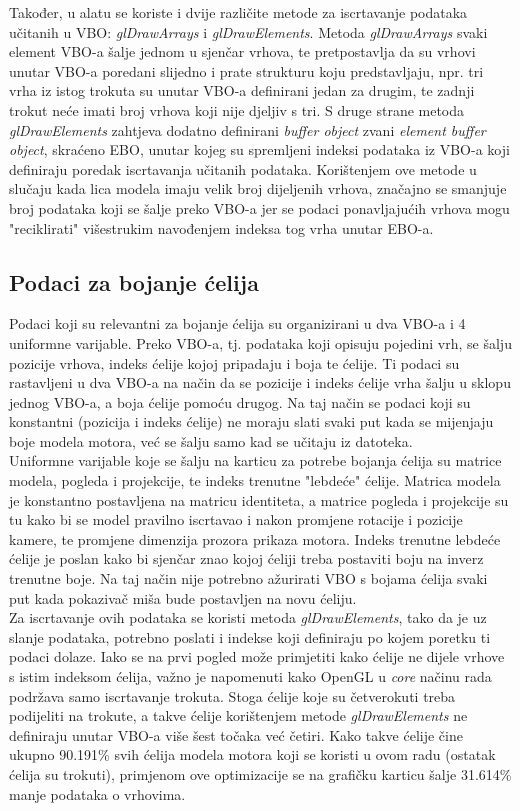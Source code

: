 \documentclass[times, utf8, diplomski]{fer}
\begin{document}
Također, u alatu se koriste i dvije različite metode za iscrtavanje podataka učitanih u VBO: \textit{glDrawArrays} i \textit{glDrawElements}. Metoda \textit{glDrawArrays} svaki element VBO-a šalje jednom u sjenčar vrhova, te pretpostavlja da su vrhovi unutar VBO-a poredani slijedno i prate strukturu koju predstavljaju, npr. tri vrha iz istog trokuta su unutar VBO-a definirani jedan za drugim, te zadnji trokut neće imati broj vrhova koji nije djeljiv s tri. S druge strane metoda \textit{glDrawElements} zahtjeva dodatno definirani \textit{buffer object} zvani \textit{element buffer object}, skraćeno EBO, unutar kojeg su spremljeni indeksi podataka iz VBO-a koji definiraju poredak iscrtavanja učitanih podataka. Korištenjem ove metode u slučaju kada lica modela imaju velik broj dijeljenih vrhova, značajno se smanjuje broj podataka koji se šalje preko VBO-a jer se podaci ponavljajućih vrhova mogu "reciklirati" višestrukim navođenjem indeksa tog vrha unutar EBO-a.

\subsection{Podaci za bojanje ćelija}

Podaci koji su relevantni za bojanje ćelija su organizirani u dva VBO-a i 4 uniformne varijable. Preko VBO-a, tj. podataka koji opisuju pojedini vrh, se šalju pozicije vrhova, indeks ćelije kojoj pripadaju i boja te ćelije. Ti podaci su rastavljeni u dva VBO-a na način da se pozicije i indeks ćelije vrha šalju u sklopu jednog VBO-a, a boja ćelije pomoću drugog. Na taj način se podaci koji su konstantni (pozicija i indeks ćelije) ne moraju slati svaki put kada se mijenjaju boje modela motora, već se šalju samo kad se učitaju iz datoteka.\\

Uniformne varijable koje se šalju na karticu za potrebe bojanja ćelija su matrice modela, pogleda i projekcije, te indeks trenutne "lebdeće" ćelije. Matrica modela je konstantno postavljena na matricu identiteta, a matrice pogleda i projekcije su tu kako bi se model pravilno iscrtavao i nakon promjene rotacije i pozicije kamere, te promjene dimenzija prozora prikaza motora. Indeks trenutne lebdeće ćelije je poslan kako bi sjenčar znao kojoj ćeliji treba postaviti boju na inverz trenutne boje. Na taj način nije potrebno ažurirati VBO s bojama ćelija svaki put kada pokazivač miša bude postavljen na novu ćeliju.\\

Za iscrtavanje ovih podataka se koristi metoda \textit{glDrawElements}, tako da je uz slanje podataka, potrebno poslati i indekse koji definiraju po kojem poretku ti podaci dolaze. Iako se na prvi pogled može primjetiti kako ćelije ne dijele vrhove s istim indeksom ćelija, važno je napomenuti kako OpenGL u \textit{core} načinu rada podržava samo iscrtavanje trokuta. Stoga ćelije koje su četverokuti treba podijeliti na trokute, a takve ćelije korištenjem metode \textit{glDrawElements} ne definiraju unutar VBO-a više šest točaka već četiri. Kako takve ćelije čine ukupno 90.191\% svih ćelija modela motora koji se koristi u ovom radu (ostatak ćelija su trokuti), primjenom ove optimizacije se na grafičku karticu šalje 31.614\% manje podataka o vrhovima.
\end{document}
